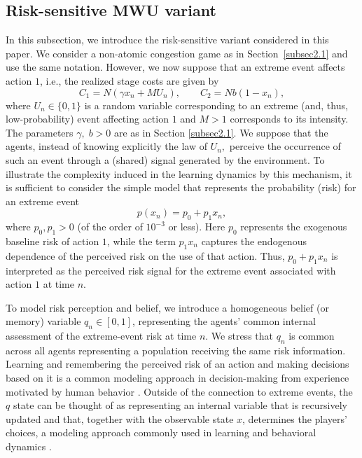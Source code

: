 \documentclass{article}
\theoremstyle{plain}
\theoremstyle{definition}
\begin{document}
\subsection{Risk-sensitive MWU variant}\label{risk_sens}
In this subsection, we introduce the risk-sensitive variant considered in this paper. We consider a non-atomic congestion game as in Section~\ref{subsec2.1} and use the same notation. However, we now suppose that an extreme event affects action $1$, i.e., the realized stage costs are given by
\begin{equation}
C_1=N(\gamma x_n+MU_n), \qquad C_2=Nb(1-x_n),
\label{eq0}
\end{equation}
where \(U_n\in\{0,1\}\) is a random variable corresponding to an  extreme (and, thus, low-probability) event affecting action \(1\) and $M>1$ corresponds to its intensity. The parameters $\gamma, \; b>0$ are as in Section \ref{subsec2.1}. We suppose that the agents, instead of knowing explicitly the law of $U_n,$ perceive the occurrence of such an event through a (shared) signal generated by the environment. To illustrate the complexity induced in the learning dynamics by this mechanism, it is sufficient to consider the simple model that represents the probability (risk) for an extreme event
\begin{equation}
p(x_n)=p_0+p_1x_n,
\label{eq_sig}
\end{equation}
where \(p_0,p_1> 0\) (of the order of $10^{-3}$ or less). Here \(p_0\) represents the exogenous baseline risk of action \(1\), while the term \(p_1x_n\) captures the endogenous dependence of the perceived risk on the use of that action. Thus, $p_0+p_1x_n$ is interpreted as the perceived risk signal for the extreme event associated with action \(1\) at time $n.$ 

To model risk perception and belief, we introduce a homogeneous belief (or memory) variable $q_n\in[0,1]$, representing the agents' common internal assessment of the extreme-event risk at time $n$. We stress that $q_n$ is common across all agents representing a population receiving the same risk information. Learning and remembering the perceived risk of an action and making decisions based on it is a common modeling approach in decision-making from experience motivated by human behavior \cite{hertwig,prelec}. Outside of the connection to extreme events, the $q$ state can be thought of as representing an internal variable that is recursively updated and that, together with the observable state $x$, determines the players' choices, a modeling approach commonly used in learning and behavioral dynamics \cite{camerer}.
\end{document}
